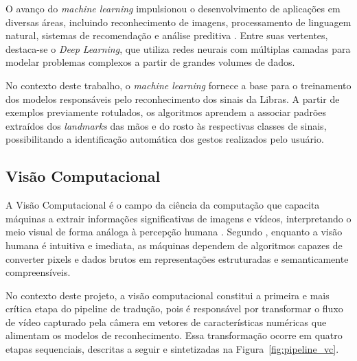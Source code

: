 \documentclass[
    12pt,                %
    openright,           %
    oneside,             %
    a4paper,             %
    english,             %
    brazil               %
]{abntex2}
\begin{document}
O avanço do \textit{machine learning} impulsionou o desenvolvimento de aplicações em diversas áreas, incluindo reconhecimento de imagens, processamento de linguagem natural, sistemas de recomendação e análise preditiva \cite{faceli2021}. Entre suas vertentes, destaca-se o \textit{Deep Learning}, que utiliza redes neurais com múltiplas camadas para modelar problemas complexos a partir de grandes volumes de dados.

No contexto deste trabalho, o \textit{machine learning} fornece a base para o treinamento dos modelos responsáveis pelo reconhecimento dos sinais da Libras. A partir de exemplos previamente rotulados, os algoritmos aprendem a associar padrões extraídos dos \textit{landmarks} das mãos e do rosto às respectivas classes de sinais, possibilitando a identificação automática dos gestos realizados pelo usuário.


\subsection{Visão Computacional}

A Visão Computacional é o campo da ciência da computação que capacita máquinas a extrair informações significativas de imagens e vídeos, interpretando o meio visual de forma análoga à percepção humana \cite{Milano2014}. Segundo , enquanto a visão humana é intuitiva e imediata, as máquinas dependem de algoritmos capazes de converter pixels e dados brutos em representações estruturadas e semanticamente compreensíveis.
 
No contexto deste projeto, a visão computacional constitui a primeira e mais crítica etapa do pipeline de tradução, pois é responsável por transformar o fluxo de vídeo capturado pela câmera em vetores de características numéricas que alimentam os modelos de reconhecimento. Essa transformação ocorre em quatro etapas sequenciais, descritas a seguir e sintetizadas na Figura~\ref{fig:pipeline_vc}.
 
\end{document}

